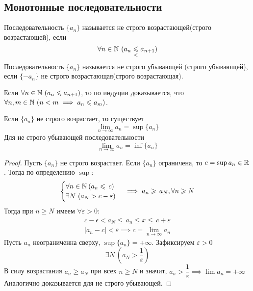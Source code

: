 

\subsection{Монотонные последовательности}
\begin{definition}
    Последовательность $ \{a_n\} $ называется не строго возрастающей(строго возрастающей), если \begin{equation}
        \forall n \in \mathbb{N} \ (a_n \underset{ <}{ \leqslant} a_{n + 1})
    \end{equation}
    Последовательность $ \{a_n\} $ называется не строго убывающей (строго убывающей), если $ \{- a_n\} $ не строго возрастающая(строго возрастающая).
\end{definition}
\begin{note}
    Если $ \forall  n \in \mathbb{N}\ (a_n \leqslant  a_{n + 1}) $, то по индуции доказывается, что $ \forall  n, m \in \mathbb{N}\ (n < m \implies  a_n \leqslant  a_m) $.
\end{note}
\begin{theorem} \label{Weierstrass_theorem}
    Если $ \{a_n\} $ не строго возрастает, то существует \[ \lim_{n \to \infty}a_n = \sup\{a_n\} \]
    Для не строго убывающей последовательности \[ \lim_{n \to \infty}a_n = \inf\{a_n\} \]
\end{theorem}
\begin{proof}
    Пусть $ \{a_n\} $ не строго возрастает. Если $ \{a_n\} $ ограничена, то $ c = \sup{a_n} \in  \mathbb{R} $. Тогда по определению $ \sup $: \begin{gather} \begin{cases}
        \forall n \in \mathbb{N}\:  (a_n \leqslant\, c) \\
        \exists N \ (a_N > c - \varepsilon)
    \end{cases} \implies a_n \geqslant\, a_N, \forall n \geqslant N
    \end{gather}
    Тогда при $ n \geq  N $ имеем $ \forall \varepsilon > 0 $: \begin{gather}
        c - \epsilon < a_N \leq\, a_n \leq x \leq\, c + \varepsilon \\
        |a_n - c | < \varepsilon \implies c = \lim_{n \to \infty} a_n
    \end{gather}
    Пусть $ a_n $ неограниченна сверху, $ \sup\{a_n\} = + \infty $. Зафиксируем $ \varepsilon > 0 $ \begin{equation}
        \exists N \ \left(a_N > \frac{1}{\varepsilon}\right)
    \end{equation} В силу возрастания $ a_n \geq a_N $ при всех $ n \geq  N $ и значит, $ a_n > \dfrac{1}{\varepsilon}  \implies  \lim a_n = + \infty$
    Аналогично доказывается для не строго убывающей.
\end{proof}
